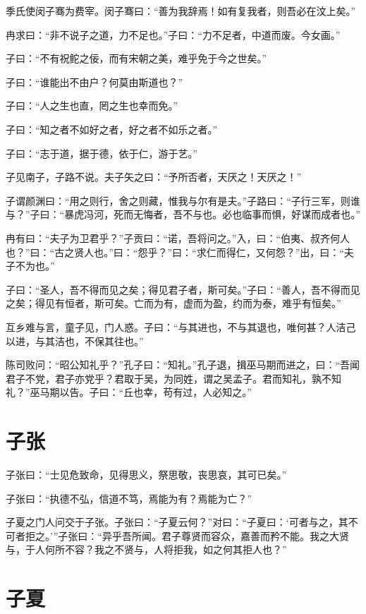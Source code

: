 \documentclass[a5paper]{ctexbook}
\begin{document}
    季氏使闵子骞为费宰。闵子骞曰：“善为我辞焉！如有复我者，则吾必在汶上矣。”

    冉求曰：“非不说子之道，力不足也。”子曰：“力不足者，中道而废。今女画。”

    子曰：“不有祝𬶍之佞，而有宋朝之美，难乎免于今之世矣。”

    子曰：“谁能出不由户？何莫由斯道也？”

    子曰：“人之生也直，罔之生也幸而免。”

    子曰：“知之者不如好之者，好之者不如乐之者。”

    

    子曰：“志于道，据于德，依于仁，游于艺。”

    

    子见南子，子路不说。夫子矢之曰：“予所否者，天厌之！天厌之！”

    子谓颜渊曰：“用之则行，舍之则藏，惟我与尔有是夫。”子路曰：“子行三军，则谁与？”子曰：“暴虎冯河，死而无悔者，吾不与也。必也临事而惧，好谋而成者也。”

    冉有曰：“夫子为卫君乎？”子贡曰：“诺，吾将问之。”入，曰：“伯夷、叔齐何人也？”曰：“古之贤人也。”曰：“怨乎？”曰：“求仁而得仁，又何怨？”出，曰：“夫子不为也。”

    子曰：“圣人，吾不得而见之矣；得见君子者，斯可矣。”子曰：“善人，吾不得而见之矣；得见有恒者，斯可矣。亡而为有，虚而为盈，约而为泰，难乎有恒矣。”

    互乡难与言，童子见，门人惑。子曰：“与其进也，不与其退也，唯何甚？人洁己以进，与其洁也，不保其往也。”

    陈司败问：“昭公知礼乎？”孔子曰：“知礼。”孔子退，揖巫马期而进之，曰：“吾闻君子不党，君子亦党乎？君取于吴，为同姓，谓之吴孟子。君而知礼，孰不知礼？”巫马期以告。子曰：“丘也幸，苟有过，人必知之。”

    \chapter{子张}

    子张曰：“士见危致命，见得思义，祭思敬，丧思哀，其可已矣。”
    
    子张曰：“执德不弘，信道不笃，焉能为有？焉能为亡？”
    
    子夏之门人问交于子张。子张曰：“子夏云何？”对曰：“子夏曰：‘可者与之，其不可者拒之。’”子张曰：“异乎吾所闻。君子尊贤而容众，嘉善而矜不能。我之大贤与，于人何所不容？我之不贤与，人将拒我，如之何其拒人也？”

    \chapter{子夏}
\end{document}

